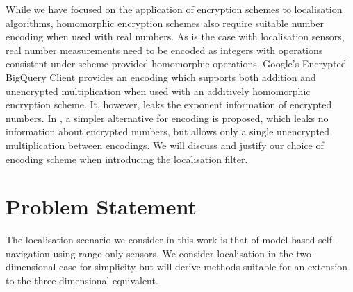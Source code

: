\documentclass[twocolumn]{autart}
\begin{document}
While we have focused on the application of encryption schemes to localisation algorithms, homomorphic encryption schemes also require suitable number encoding when used with real numbers. As is the case with localisation sensors, real number measurements need to be encoded as integers with operations consistent under scheme-provided homomorphic operations. Google's Encrypted BigQuery Client \cite{Encryptedbigqueryclient2015} provides an encoding which supports both addition and unencrypted multiplication when used with an additively homomorphic encryption scheme. It, however, leaks the exponent information of encrypted numbers. In \cite{farokhiSecurePrivateControl2017}, a simpler alternative for encoding is proposed, which leaks no information about encrypted numbers, but allows only a single unencrypted multiplication between encodings. We will discuss and justify our choice of encoding scheme when introducing the localisation filter.

% 
%                                                                                
%                                                                                
%                                                                                
% 

\section{Problem Statement} \label{sec:problem_statement}
The localisation scenario we consider in this work is that of model-based self-navigation using range-only sensors. We consider localisation in the two-dimensional case for simplicity but will derive methods suitable for an extension to the three-dimensional equivalent.
\end{document}
